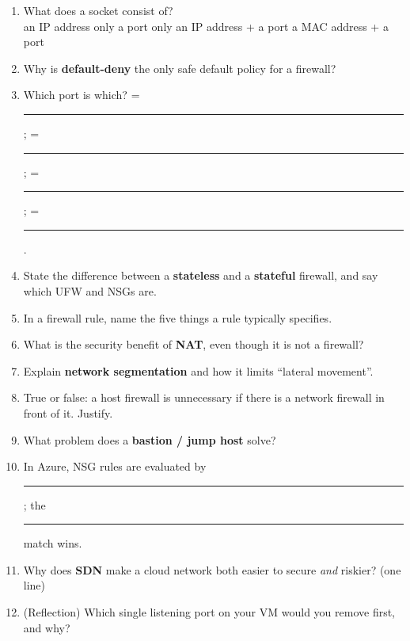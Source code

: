 \documentclass[11pt]{article}
\begin{document}
\begin{enumerate}
\item What does a socket consist of?\\
      \cbox an IP address only \quad \cbox a port only \quad \cbox an IP address + a port \quad
      \cbox a MAC address + a port
\item Why is \textbf{default-deny} the only safe default policy for a firewall?
\item Which port is which?  = \rule{2.2cm}{0.3pt};  = \rule{2.2cm}{0.3pt};
       = \rule{2.2cm}{0.3pt};  = \rule{2.2cm}{0.3pt}.
\item State the difference between a \textbf{stateless} and a \textbf{stateful} firewall, and say
      which UFW and NSGs are.
\item In a firewall rule, name the five things a rule typically specifies.
\item What is the security benefit of \textbf{NAT}, even though it is not a firewall?
\item Explain \textbf{network segmentation} and how it limits ``lateral movement''.
\item True or false: a host firewall is unnecessary if there is a network firewall in front of it.
      Justify.
\item What problem does a \textbf{bastion / jump host} solve?
\item In Azure, NSG rules are evaluated by \rule{3cm}{0.3pt}; the \rule{2cm}{0.3pt} match wins.
\item Why does \textbf{SDN} make a cloud network both easier to secure \emph{and} riskier? (one line)
\item (Reflection) Which single listening port on your VM would you remove first, and why?
\end{enumerate}
\end{document}
